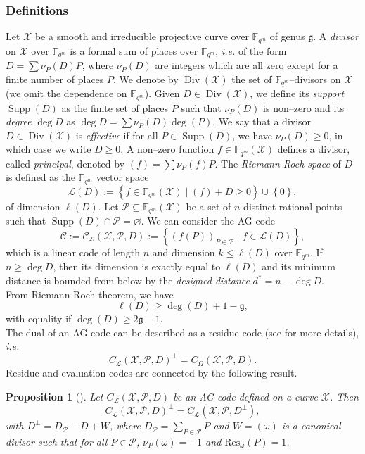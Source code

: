 \documentclass[a4paper]{article}
\newtheorem{proposition}[thm]{Proposition}
\theoremstyle{definition}
\theoremstyle{remark}
\newcommand{\calP}{\mathcal{P}}
\newcommand{\calL}{\mathcal{L}}
\newcommand{\calC}{\mathcal{C}}
\newcommand{\calX}{\mathcal{X}}
\newcommand{\fqm}{\mathbb{F}_{q^m}}
\newcommand{\set}[1]{\left\{#1\right\}}
\newcommand{\Supp}{\operatorname{Supp}}
\newcommand{\Div}{\operatorname{Div}}
\begin{document}
\subsubsection{Definitions}

Let $\calX$ be a smooth and irreducible projective curve over $\fqm$ of genus $\mathfrak{g}$. A \emph{divisor} on $\calX$ over $\fqm$ is a formal sum of places over $\fqm$, \emph{i.e.} of the form $D=\sum \nu_P(D) P$, where $\nu_P(D)$ are integers which are all zero except for a finite number of places $P$. We denote by $\Div(\calX)$ the set of $\fqm$--divisors on $\calX$ (we omit the dependence on $\fqm$).
Given $D \in \Div(\calX)$, we define its \emph{support} $\Supp(D)$ as the finite set of places $P$ such that $\nu_P(D)$ is non--zero and its \emph{degree} $\deg D$ as $\deg D=\sum \nu_P(D) \deg(P)$. We say that a divisor $D \in \Div(\calX)$ is \emph{effective} if for all $P \in \Supp(D)$, we have $\nu_P(D) \geq 0$, in which case we write $D \geq 0$.
A non--zero function $f \in \fqm(\calX)$ defines a divisor, called \emph{principal}, denoted by $(f)=\sum \nu_P(f) P$. The \emph{Riemann-Roch space} of $D$ is defined as the $\fqm$ vector space
$$ \calL(D) := \set{f \in \fqm(\calX) \mid (f) + D \geq 0} \cup \set{0},$$
of dimension $\ell(D)$.
Let $\calP \subseteq \fqm(\calX)$ be a set of $n$ distinct rational points such that $\Supp(D) \cap \calP = \varnothing$.
We can consider the AG code 
$$\calC := \calC_{\calL}(\calX,\calP,D) := \set{\left(f(P)\right)_{P \in \calP} \mid f \in \calL(D)},$$
which is a linear code of length $n$ and dimension $k \leq \ell(D)$ over $\fqm$. If $n \geq \deg D$, then its dimension is exactly equal to $\ell(D)$ and its minimum distance is bounded from below by the \emph{designed distance} $d^*=n-\deg D$.\\
From Riemann-Roch theorem, we have
$$ \ell(D) \geq \deg(D) +1 - \mathfrak{g},$$ 
with equality if $\deg(D) \geq 2\mathfrak{g}-1$.\\

The dual of an AG code can be described as a residue code (see \cite{Sti09} for more details), \emph{i.e.}
$$ C_{\calL}(\calX,\calP,D)^{\perp} = C_{\Omega}(\calX,\calP,D).$$ 
Residue and evaluation codes are connected by the following result.

\begin{proposition} [{\cite[Proposition~2.2.10]{Sti09}}] \label{prop:dual_AG_codes}
Let $C_{\calL}(\calX,\calP,D)$ be an AG-code defined on a curve $\calX$. Then 
\[C_{\calL}(\calX,\calP,D)^{\perp} = C_{\calL}(\calX,\calP,D^{\perp}),\]
with $D^{\perp} = D_{\calP}-D+W$, where $D_{\calP} = \sum\limits_{P \in \calP} P$ and $W=(\omega)$ is a canonical divisor such that for all $P \in \calP$, $\nu_P(\omega)=-1$ and $\mathrm{Res}_{\omega}(P)=1$. 
\end{proposition}
\end{document}
